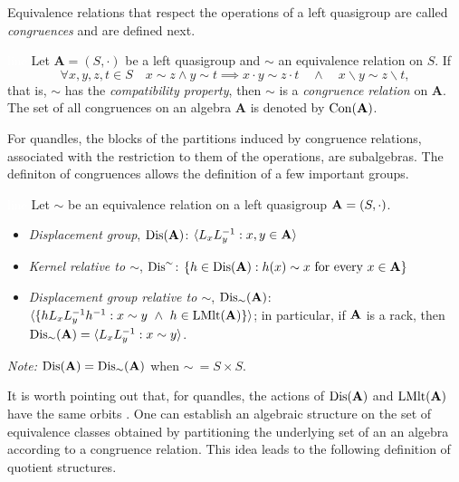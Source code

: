 Equivalence relations that respect the operations of a left quasigroup are called \emph{congruences} and are defined next.
\begin{definition} \cite{burris1981course}\textcolor{white}{line}\newline\label{congruencedef}
Let $\mathbf{A}=(S,\cdot)$ be a left quasigroup and $\sim$ an equivalence relation on $S$. If
\[\forall x,y,z,t \in S \quad x \sim z \land y \sim t \implies x \cdot y \sim z \cdot t\quad \land \quad x \backslash y \sim z \backslash t,\]
that is, $\sim$ has the \emph{compatibility property}, then $\sim$ is a \emph{congruence relation} on $\mathbf{A}$. \newline The set of all congruences on an algebra $\mathbf{A}$ is denoted by $\operatorname{Con}(\mathbf{A})$.
\end{definition}
\noindent For quandles, the blocks of the partitions induced by congruence relations, associated with the restriction to them of the operations, are subalgebras.
\noindent The definiton of congruences allows the definition of a few important groups. 
\begin{definition} \cite{BonStanCommTheory2021}\label{defdis}\textcolor{white}{line}\newline
Let $\sim$ be an equivalence relation on a left quasigroup $\mathbf{A} = (S, \cdot)$.
\begin{itemize}
\item \textit{Displacement group}, $\operatorname{Dis}(\mathbf{A})$: $\langle L_xL_y^{-1} : x, y \in \mathbf{A}\rangle$
    \item \textit{Kernel relative to $\sim$}, $\operatorname{Dis}^{\sim}$: $\{ h \in \operatorname{Dis}(\mathbf{A}) : h(x)\sim x~\text{for every}~x \in \mathbf{A}\}$ 
    \item \textit{Displacement group relative to $\sim$},  $\operatorname{Dis}_{\sim}(\mathbf{A})$:\newline $\langle \{ hL_xL_y^{-1}h^{-1}: x\sim y~\land~ h\in \operatorname{LMlt}(\mathbf{A}) \} \rangle$; in particular, if $\mathbf{A}$ is a rack, then $\operatorname{Dis}_{\sim}(\mathbf{A}) = \langle L_xL_y^{-1}: x\sim y\rangle$.
\end{itemize}
\emph{Note:} $\operatorname{Dis}(\mathbf{A}) = \operatorname{Dis}_{\sim}(\mathbf{A})$ when $\sim~=S\times S$.
\end{definition}
\noindent It is worth pointing out that, for quandles, the actions of $\operatorname{Dis}(\mathbf{A})$ and  $\operatorname{LMlt}(\mathbf{A})$ have the same orbits \cite{BonStanCommTheory2021}.\newline\newline 
\noindent One can establish an algebraic structure on the set of equivalence classes obtained by partitioning the underlying set of an an algebra according to a congruence relation. This idea leads to the following definition of quotient structures.
